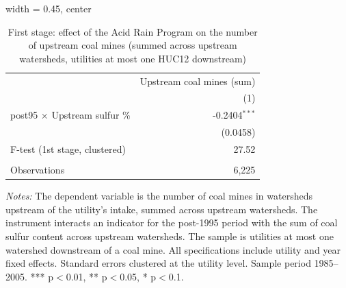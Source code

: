 
\begin{table}[htbp]
   
   \caption{\label{tab:fs_dwnstrm_minevio_ivsum} First stage: effect of the Acid Rain Program on the number of upstream coal mines (summed across upstream watersheds, utilities at most one HUC12 downstream)}
   \bigskip
   
   \centering
   
   \begin{adjustbox}{width = 0.45\textwidth, center}
      
      
      \begin{tabular}{lr}
         \toprule
         
                                              & Upstream coal mines (sum)\\  
         
                                              & (1)\\  
         
         \midrule 
         post95 $\times$ Upstream sulfur \%   & -0.2404$^{***}$\\   
                                              & (0.0458)\\   
         
         F-test (1st stage, clustered)        & 27.52\\  
         
          \\
         
         Observations                         & 6,225\\  
         
         \bottomrule
         
      \end{tabular}
      
      
      
   \end{adjustbox}
      {\tiny\linespread{1}\selectfont \par \raggedright 
   \textit{Notes:} The dependent variable is the number of coal mines in watersheds upstream of the utility's intake, summed across upstream watersheds. The instrument interacts an indicator for the post-1995 period with the sum of coal sulfur content across upstream watersheds. The sample is utilities at most one watershed downstream of a coal mine. All specifications include utility and year fixed effects. Standard errors clustered at the utility level. Sample period 1985--2005. *** p$<$0.01, ** p$<$0.05, * p$<$0.1.}
   
\end{table}



